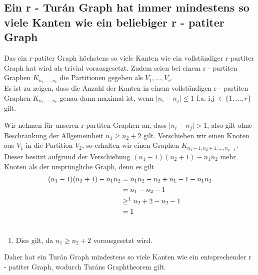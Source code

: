 \documentclass[12pt, a4paper]{article}
\begin{document}
\subsection{Ein r - Turán Graph hat immer mindestens so viele Kanten wie ein beliebiger  r - patiter Graph}
Das ein r-patiter Graph höchstens so viele Kanten wie ein vollständiger r-partiter Graph hat wird als trivial vorausgesetzt. Zudem seien bei einem r - partiten Graphen $K_{n_1,...,n_r}$  die Partitionen gegeben als $V_1, ..., V_r$. \\
Es ist zu zeigen, dass die Anzahl der Kanten in einem vollständigen r - partiten Graphen $K_{n_1,...,n_r}$ genau dann maximal ist, wenn $\mid n_i - n_j \mid \le 1$ f.a. i,j $\in \{1, ...,  r \}$ gilt.

Wir nehmen für unseren r-partiten Graphen an, dass $\mid n_i - n_j \mid > 1$, also gilt ohne Beschränkung der Allgemeinheit $n_1 \ge n_2 + 2$ gilt.
Verschieben wir einen Knoten aus $V_1$ in die Partition $V_2$, so erhalten wir einen Graphen $K_{n_1 - 1, n_2 + 1,...,n_{p - 1}}$. Dieser besitzt aufgrund der Verschiebung $(n_1 - 1)(n_2 + 1) - n_1 n_2$ mehr Knoten als der ursprüngliche Graph, denn es gilt
\begin{gather}
\begin{split}(n_1 - 1)(n_2 + 1) - n_1 n_2 &= n_1 n_2 - n_2 + n_1 - 1 - n_1 n_2 \\
&= n_1 - n_2 - 1 \\
&\ge^1 n_2 + 2 - n_2 - 1 \\
&= 1\end{split}\notag\\\begin{split}\end{split}\notag
\end{gather}\begin{enumerate}
\item {}
Dies gilt, da $n_1 \ge n_2 + 2$ vorausgesetzt wird.

\end{enumerate}

Daher hat ein Turán Graph mindestens so viele Kanten wie ein entsprechender r - patiter Graph, wodurch Turáns Graphtheorem gilt.
\end{document}
